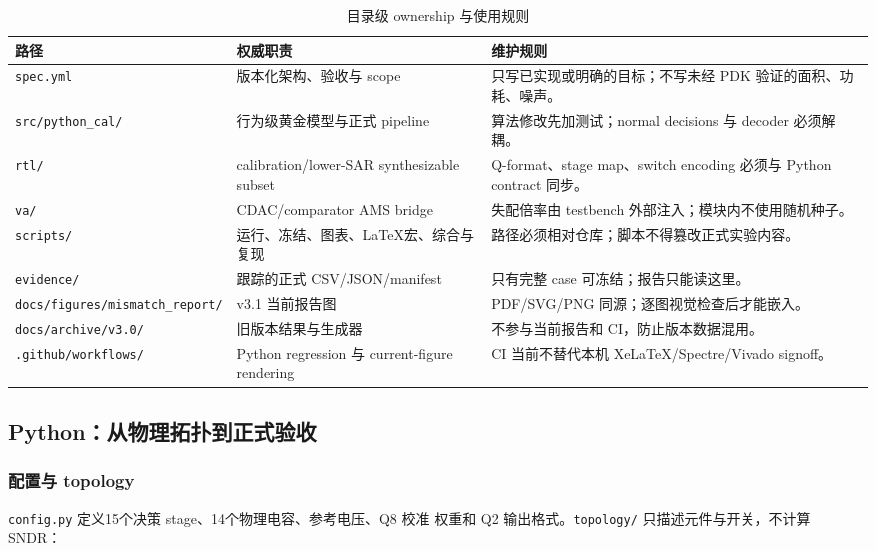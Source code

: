 \documentclass[UTF8,11pt,a4paper]{ctexart}
\newcommand{\code}[1]{\texttt{\small #1}}
\newcommand{\pathcode}[1]{{\small\nolinkurl{#1}}}
\newcommand{\tablehead}{\rowcolor{PaleBlue}\bfseries\sffamily\color{DeepNavy}}
\begin{document}
\begin{table}[htbp]
  \centering
  \caption{目录级 ownership 与使用规则}
  \small
  \begin{tabularx}{\textwidth}{@{}p{34mm}p{38mm}Y@{}}
    \toprule
    \tablehead 路径 & 权威职责 & 维护规则\\
    \midrule
    \code{spec.yml} &
      版本化架构、验收与 scope &
      只写已实现或明确的目标；不写未经 PDK 验证的面积、功耗、噪声。\\
    \code{src/python\_cal/} &
      行为级黄金模型与正式 pipeline &
      算法修改先加测试；normal decisions 与 decoder 必须解耦。\\
    \code{rtl/} &
      calibration/lower-SAR synthesizable subset &
      Q-format、stage map、switch encoding 必须与 Python contract 同步。\\
    \code{va/} &
      CDAC/comparator AMS bridge &
      失配倍率由 testbench 外部注入；模块内不使用随机种子。\\
    \code{scripts/} &
      运行、冻结、图表、LaTeX宏、综合与复现 &
      路径必须相对仓库；脚本不得篡改正式实验内容。\\
    \code{evidence/} &
      跟踪的正式 CSV/JSON/manifest &
      只有完整 case 可冻结；报告只能读这里。\\
    \pathcode{docs/figures/mismatch_report/} &
      v3.1 当前报告图 &
      PDF/SVG/PNG 同源；逐图视觉检查后才能嵌入。\\
    \pathcode{docs/archive/v3.0/} &
      旧版本结果与生成器 &
      不参与当前报告和 CI，防止版本数据混用。\\
    \pathcode{.github/workflows/} &
      Python regression 与 current-figure rendering &
      CI 当前不替代本机 XeLaTeX/Spectre/Vivado signoff。\\
    \bottomrule
  \end{tabularx}
\end{table}

\subsection{Python：从物理拓扑到正式验收}

\subsubsection{配置与 topology}

\code{config.py} 定义15个决策 stage、14个物理电容、参考电压、Q8 校准
权重和 Q2 输出格式。\code{topology/} 只描述元件与开关，不计算 SNDR：
\end{document}
